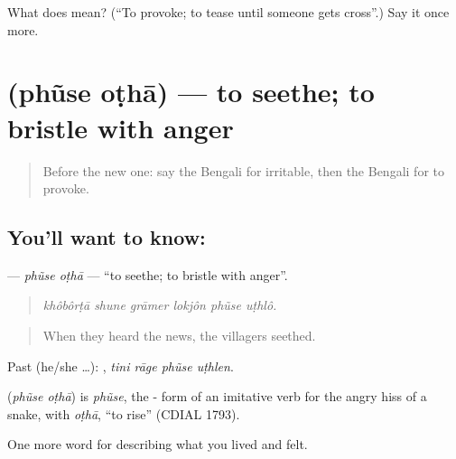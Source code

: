 \begin{tcolorbox}[breakable,colback=teal!4,colframe=teal!35!black,title={Before you move on}]
What does  mean? (\textquotedblleft{}To provoke; to tease until someone gets cross\textquotedblright{}.) Say it once more.
\end{tcolorbox}
\section[\texorpdfstring{\bn{ফুঁসে} \bn{ওঠা} (phũse oṭhā)}{ফুঁসে ওঠা (phũse oṭhā)}]{  (phũse oṭhā) — to seethe; to bristle with anger}

\label{lesson:BN-C443-phuse-otha}



\begin{quote}
Before the new one: say the Bengali for irritable, then the Bengali for to provoke.
\end{quote}

\subsection*{You'll want to know:  }
\textbf{ } — \emph{phũse oṭhā} — \textquotedblleft{}to seethe; to bristle with anger\textquotedblright{}.

\begin{quote}
     
\end{quote}

\begin{quote}
\emph{khôbôrṭā shune grāmer lokjôn phũse uṭhlô.}
\end{quote}

\begin{quote}
When they heard the news, the villagers seethed.
\end{quote}

Past (he/she …):    , \emph{tini rāge phũse uṭhlen}.

\begin{cousinweb}
\textbf{ } (\emph{phũse oṭhā}) is \emph{phũse}, the - form of an imitative verb for the angry hiss of a snake, with \emph{oṭhā}, \textquotedblleft{}to rise\textquotedblright{} (CDIAL 1793).
\end{cousinweb}

\begin{grammarlens}[title={What you've built}]
One more word for describing what you lived and felt.
\end{grammarlens}

